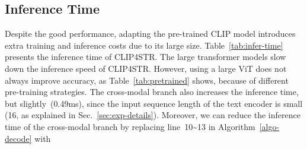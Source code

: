 \documentclass[lettersize,journal]{IEEEtran}
\begin{document}
\begin{table}[!t]
    \centering
    \caption{\textbf{Inference time of CLIP4STR}.
        Average accuracy on 9 benchmarks~(14,315 samples) in Table~\ref{tab:main-results} are reported.
        AR stands for autoregressive decoding, and cloze stands for cloze-filling
        decoding manner~(see Alogorithm~\ref{algo-decode}).
        Iter. is the number of refinement iterations during decoding.
        Time is the average inference time per sample.
        Test on a single NVIDIA A100 40GB GPU.
    }
    \setlength\tabcolsep{3pt}
  \label{tab:infer-time}
\end{table} 

\subsection{Inference Time} \label{sec-inference-time}

Despite the good performance, adapting the pre-trained CLIP model introduces extra training and inference costs due to its large size.
Table~\ref{tab:infer-time} presents the inference time of CLIP4STR.
The large transformer models slow down the inference speed of CLIP4STR. However, using a large ViT does not always improve accuracy, as Table~\ref{tab:pretrained} shows, because of different pre-training strategies. 
The cross-modal branch also increases the inference time, but slightly~(0.49ms), since the input sequence length of the text encoder is small (16, as explained in Sec.~\ref{sec:exp-details}).
Moreover, we can reduce the inference time of the cross-modal branch by replacing line~10\textasciitilde13 in Algorithm~\ref{algo-decode} with
\end{document}
